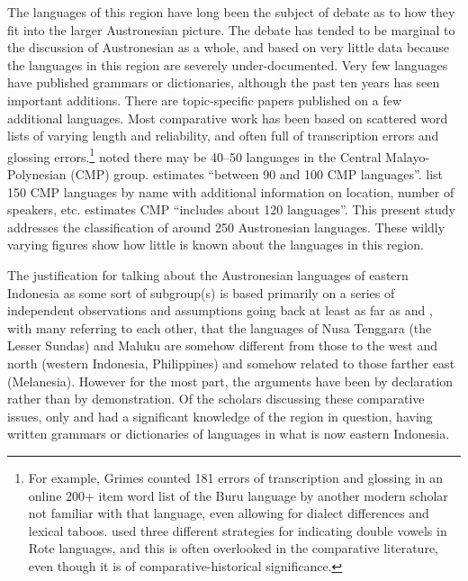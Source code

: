 The languages of this region have long been the subject of debate as to how they fit into the larger Austronesian picture.
The debate has tended to be marginal to the discussion of Austronesian as a whole,
and based on very little data because the languages in this region are severely under-documented.
Very few languages have published grammars or dictionaries,
although the past ten years has seen important additions.
There are topic-specific papers published on a few additional languages.
Most comparative work has been based on scattered word lists of varying length
and reliability, and often full of transcription errors
and glossing errors.\footnote{For example,
		Grimes counted 181 errors of transcription
		and glossing in an online 200+ item word list of the Buru language
		by another modern scholar not familiar with that language,
		even allowing for dialect differences and lexical taboos.
		\citet{Jonker1908,Jonker1915} used three different strategies for indicating double vowels in Rote languages,
		and this is often overlooked in the comparative literature,
		even though it is of comparative-historical significance.}
\citet{Clark1987} noted there may be 40--50 languages in the Central Malayo-Polynesian (CMP) group.
\citet[288]{Blust1993} estimates “between 90 and 100 CMP languages”.
\citet{Grimes1995} list 150 CMP languages by name with additional information on location,
number of speakers, etc.
\citet[32]{Blust2013} estimates CMP “includes about 120 languages”.
This present study addresses the classification of around 250 Austronesian languages.
These wildly varying figures show how little is known about the languages in this region.

The justification for talking about the Austronesian languages of eastern Indonesia
as some sort of subgroup(s) is based primarily on a series of independent observations
and assumptions going back at least as far as
\citet{Brandes1884,Friederici1913,Jonker1914,Esser1938} and \citet{Salzner1960},
with many referring to each other,
that the languages of Nusa Tenggara (the Lesser Sundas)
and Maluku are somehow different from those to the west
and north (western Indonesia,
Philippines)
and somehow related to those farther east (Melanesia).
However for the most part,
the arguments have been by declaration rather than by demonstration.
Of the scholars discussing these comparative issues,
only \citet{Jonker1908,Jonker1913,Jonker1915,Jonker1932}
and \citet{Stresemann1918,Stresemann1927} had a significant knowledge of the region in question,
having written grammars or dictionaries of languages in what is now eastern Indonesia.

